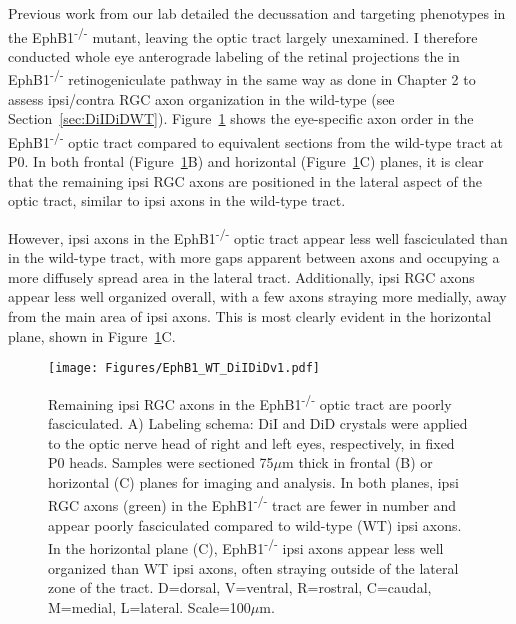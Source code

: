 \label{sec:DiIDiDEphB1}
Previous work from our lab detailed the decussation and targeting phenotypes in the EphB1\textsuperscript{-/-} mutant, leaving the optic tract largely unexamined.
I therefore conducted whole eye anterograde labeling of the retinal projections the in EphB1\textsuperscript{-/-} retinogeniculate pathway in the same way as done in Chapter 2 to assess ipsi/contra RGC axon organization in the wild-type (see Section~\ref{sec:DiIDiDWT}).
Figure~\ref{EphB1WTDiIDiD} shows the eye-specific axon order in the EphB1\textsuperscript{-/-} optic tract compared to equivalent sections from the wild-type tract at P0.
In both frontal (Figure~\ref{EphB1WTDiIDiD}B) and horizontal (Figure~\ref{EphB1WTDiIDiD}C) planes, it is clear that the remaining ipsi RGC axons are positioned in the lateral aspect of the optic tract, similar to ipsi axons in the wild-type tract.

However, ipsi axons in the EphB1\textsuperscript{-/-} optic tract appear less well fasciculated than in the wild-type tract, with more gaps apparent between axons and occupying a more diffusely spread area in the lateral tract.
Additionally, ipsi RGC axons appear less well organized overall, with a few axons straying more medially, away from the main area of ipsi axons.
This is most clearly evident in the horizontal plane, shown in Figure~\ref{EphB1WTDiIDiD}C.
\begin{figure}[hbtp]
    \begin{center}
        \texttt{[image: Figures/EphB1\_WT\_DiIDiDv1.pdf]}
        \caption[Remaining ipsi RGC axons in the EphB1\textsuperscript{-/-} optic tract are poorly fasciculated.]
        {Remaining ipsi RGC axons in the EphB1\textsuperscript{-/-} optic tract are poorly fasciculated.
        A) Labeling schema: DiI and DiD crystals were applied to the optic nerve head of right and left eyes, respectively, in fixed P0 heads.
        Samples were sectioned 75$\mu$m thick in frontal (B) or horizontal (C) planes for imaging and analysis.
        In both planes, ipsi RGC axons (green) in the EphB1\textsuperscript{-/-} tract are fewer in number and appear poorly fasciculated compared to wild-type (WT) ipsi axons.
        In the horizontal plane (C), EphB1\textsuperscript{-/-} ipsi axons appear less well organized than WT ipsi axons, often straying outside of the lateral zone of the tract.
        D=dorsal, V=ventral, R=rostral, C=caudal, M=medial, L=lateral.
        Scale=100$\mu$m.
        }
        \label{EphB1WTDiIDiD}
    \end{center}
\end{figure}


